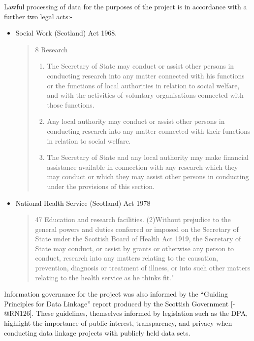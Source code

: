 \documentclass[]{article}
\begin{document}
Lawful processing of data for the purposes of the project is in
accordance with a further two legal acts:-

\begin{itemize}[noitemsep]
\item Social Work (Scotland) Act 1968.
\begin{quotation} 8 Research \begin{enumerate}
\item The Secretary of State may conduct or assist other persons in conducting research into any matter connected with his functions or the functions of local authorities in relation to social welfare, and with the activities of voluntary organisations connected with those functions.
\item Any local authority may conduct or assist other persons in conducting research into any matter connected with their functions in relation to social welfare.
\item The Secretary of State and any local authority may make financial assistance available in connection with any research which they may conduct or which they may assist other persons in conducting under the provisions of this section.
\end{enumerate} \end{quotation}
\item National Health Service (Scotland) Act 1978
\begin{quotation} 47 Education and research facilities. (2)Without prejudice to the general powers and duties conferred or imposed on the Secretary of State under the Scottish Board of Health Act 1919, the Secretary of State may conduct, or assist by grants or otherwise any person to conduct, research into any matters relating to the causation, prevention, diagnosis or treatment of illness, or into such other matters relating to the health service as he thinks fit."
\end{quotation}
\end{itemize}

Information governance for the project was also informed by the
``Guiding Principles for Data Linkage'' report produced by the Scottish
Government {[}-@RN126{]}. These guidelines, themselves informed by
legislation such as the DPA, highlight the importance of public
interest, transparency, and privacy when conducting data linkage
projects with publicly held data sets.
\end{document}
